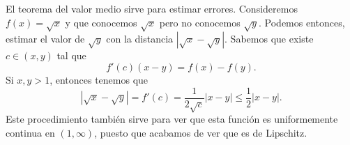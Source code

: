 \begin{eg}
\normalfont El teorema del valor medio sirve para estimar errores. Consideremos $\displaystyle f\left(x\right) = \sqrt{x} $ y que conocemos $\displaystyle \sqrt{x} $ pero no conocemos $\displaystyle \sqrt{y} $. Podemos entonces, estimar el valor de $\displaystyle \sqrt{y} $ con la distancia $\displaystyle \left|\sqrt{x}-\sqrt{y}\right| $. Sabemos que existe $\displaystyle c \in \left(x,y\right) $ tal que 
\[ f'\left(c\right)\left(x-y\right) = f\left(x\right)-f\left(y\right) .\]
Si $\displaystyle x,y > 1 $, entonces tenemos que 
\[ \left|\sqrt{x}-\sqrt{y}\right| = f'\left(c\right) = \frac{1}{2\sqrt{c}} \left|x-y\right| \leq \frac{1}{2} \left|x-y\right| .\]
Este procedimiento también sirve para ver que esta función es uniformemente continua en $\displaystyle (1,\infty) $, puesto que acabamos de ver que es de Lipschitz.
\end{eg}
